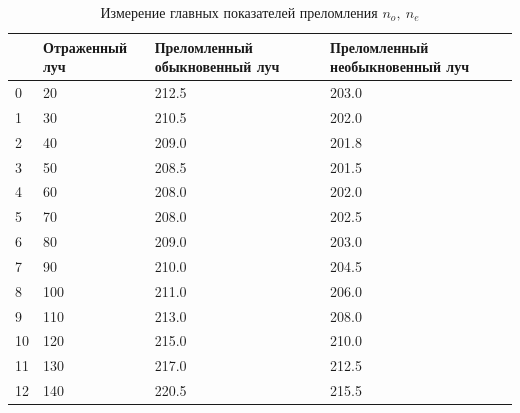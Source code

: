 \documentclass[12pt]{article}
\begin{document}
    \begin{table}
        \centering
        \caption{Измерение главных показателей преломления $n_o,\ n_e$}
        \label{tab:tab2}
        \begin{tabular}{|p{0.5cm}|p{3cm}|p{4cm}|p{4cm}|}
            \hline
            {} & Отраженный луч & Преломленный обыкновенный луч & Преломленный необыкновенный луч \\\hline
            0  & 20             & 212.5                         & 203.0                           \\
            1  & 30             & 210.5                         & 202.0                           \\
            2  & 40             & 209.0                         & 201.8                           \\
            3  & 50             & 208.5                         & 201.5                           \\
            4  & 60             & 208.0                         & 202.0                           \\
            5  & 70             & 208.0                         & 202.5                           \\
            6  & 80             & 209.0                         & 203.0                           \\
            7  & 90             & 210.0                         & 204.5                           \\
            8  & 100            & 211.0                         & 206.0                           \\
            9  & 110            & 213.0                         & 208.0                           \\
            10 & 120            & 215.0                         & 210.0                           \\
            11 & 130            & 217.0                         & 212.5                           \\
            12 & 140            & 220.5                         & 215.5                           \\\hline
        \end{tabular}
    \end{table}
\end{document}
